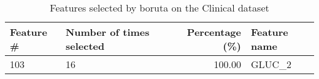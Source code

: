 \begin{table}
\caption{Features selected by boruta on the Clinical dataset}
\label{tab:features_boruta_clinical}
\begin{tabular}{llrl}
\toprule
Feature \# & Number of times selected & Percentage (\%) & Feature name \\
\midrule
103 & 16 & 100.00 & GLUC_2 \\
\bottomrule
\end{tabular}
\end{table}
